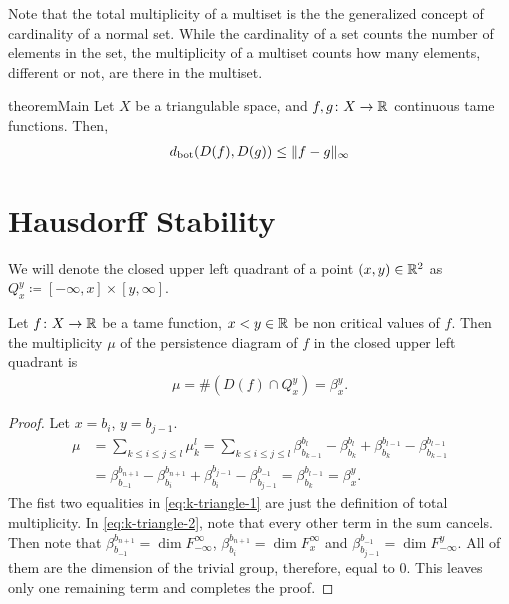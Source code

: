Note that the total multiplicity of a multiset is the the generalized concept of cardinality of a normal set. While the cardinality of a set counts the number of elements in the set, the multiplicity of a multiset counts how many elements, different or not, are there in the multiset.

\begin{restatable}{theorem}{Main} \label{lemma:edelsbrunner-stability}
    Let $ X $ be a triangulable space, and $ f, g\colon X \to \mathbb R $ continuous tame functions. Then,
    \begin{align}
        d_{\operatorname{bot}} (D(f), D(g)) \leq \|f-g\|_\infty
    \end{align}
\end{restatable}

\section{Hausdorff Stability}

We will denote the closed upper left quadrant of a point $ (x, y) \in \mathbb R^2 $ as $ Q_x^y \coloneq [-\infty, x] \times [y, \infty] $.

\begin{lemma} \label{lemma:k-triangle}
    Let $ f\colon X \to \mathbb R $ be a tame function, $ x < y \in \mathbb R $ be non critical values of $ f $. Then the multiplicity $\mu $ of the persistence diagram of $ f $ in the closed upper left quadrant is 
    \begin{align}
        \mu = \# (D(f) \cap Q_x^y) = \beta_x^y.
    \end{align}
\end{lemma}
\begin{proof}
    Let $ x = b_i $, $ y = b_{j-1} $.
    \begin{align} 
        \mu &= \sum_{k \leq i \leq j \leq l} \mu_k^l = \sum_{k \leq i \leq j \leq l} \beta_{b_{k-1}}^{b_l} - \beta_{b_k}^{b_l} + \beta_{b_k}^{b_{l-1}} - \beta_{b_{k-1}}^{b_{l-1}} \label{eq:k-triangle-1} \\
        &= \beta_{b_{-1}}^{b_{n+1}} - \beta_{b_i}^{b_{n+1}} + \beta_{b_i}^{b_{j-1}} - \beta_{b_{j-1}}^{b_{-1}} = \beta_{b_k}^{b_{l-1}} = \beta_x^y. \label{eq:k-triangle-2}
    \end{align}
    The fist two equalities in \eqref{eq:k-triangle-1} are just the definition of total multiplicity. In \eqref{eq:k-triangle-2}, note that every other term in the sum cancels. Then note that $ \beta_{b_{-1}}^{b_{n+1}} = \dim F_{-\infty}^{\infty} $, $ \beta_{b_i}^{b_{n+1}} = \dim F_{x}^{\infty} $ and $ \beta_{b_{j-1}}^{b_{-1}} = \dim F_{-\infty}^y $. All of them are the dimension of the trivial group, therefore, equal to $ 0 $. This leaves only one remaining term and completes the proof.
\end{proof}

